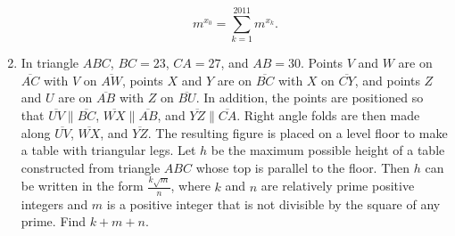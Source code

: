 \documentclass{article}
\begin{document}
\begin{enumerate}[label=\arabic*., itemsep=0.5em]
\begin{equation*}
m^{x_0} = \sum_{k = 1}^{2011} m^{x_k}.
\end{equation*}
\par \vspace{0.5em}\item In triangle $ABC$, $BC = 23$, $CA = 27$, and $AB = 30$.  Points $V$ and $W$ are on $\overline{AC}$ with $V$ on $\overline{AW}$, points $X$ and $Y$ are on $\overline{BC}$ with $X$ on $\overline{CY}$, and points $Z$ and $U$ are on $\overline{AB}$ with $Z$ on $\overline{BU}$.  In addition, the points are positioned so that $\overline{UV} \parallel \overline{BC}$, $\overline{WX} \parallel \overline{AB}$, and $\overline{YZ} \parallel \overline{CA}$.  Right angle folds are then made along $\overline{UV}$, $\overline{WX}$, and $\overline{YZ}$.  The resulting figure is placed on a level floor to make a table with triangular legs.  Let $h$ be the maximum possible height of a table constructed from triangle $ABC$ whose top is parallel to the floor.  Then $h$ can be written in the form $\frac{k \sqrt{m}}{n}$, where $k$ and $n$ are relatively prime positive integers and $m$ is a positive integer that is not divisible by the square of any prime.  Find $k + m + n$.


\end{enumerate}
\end{document}
